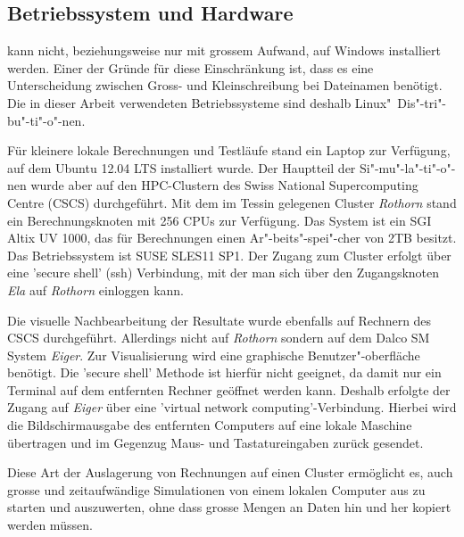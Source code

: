 \subsection{Betriebssystem und Hardware}
\label{Kapitel:Hardware}
\openfoam{} kann nicht, beziehungsweise nur mit grossem Aufwand, auf Windows installiert werden. Einer der Gründe für diese Einschränkung ist, dass es eine Unterscheidung zwischen Gross- und Kleinschreibung bei Dateinamen benötigt. Die in dieser Arbeit verwendeten Betriebssysteme sind deshalb Linux"~Dis"-tri"-bu"-ti"-o"-nen.

Für kleinere lokale Berechnungen und Testläufe stand ein Laptop zur Verfügung, auf dem Ubuntu 12.04 LTS installiert wurde.
Der Hauptteil der Si"-mu"-la"-ti"-o"-nen wurde aber auf den HPC-Clustern des Swiss National Supercomputing Centre (CSCS) durchgeführt.
Mit dem im Tessin gelegenen Cluster \emph{Rothorn} stand ein Berechnungsknoten mit 256 CPUs zur Verfügung. Das System ist ein SGI Altix UV 1000, das für Berechnungen einen Ar"-beits"-spei"-cher von 2TB besitzt.
Das Betriebssystem ist SUSE SLES11 SP1.
Der Zugang zum Cluster erfolgt über eine 'secure shell' (ssh) Verbindung, mit der man sich über den Zugangsknoten \emph{Ela} auf \emph{Rothorn} einloggen kann.

Die visuelle Nachbearbeitung der Resultate wurde ebenfalls auf Rech\-nern des CSCS durchgeführt. Allerdings nicht auf \emph{Rothorn} sondern auf dem \linebreak Dalco SM System \emph{Eiger}.
Zur Visualisierung wird eine graphische Benutzer"-oberfläche benötigt. Die 'secure shell' Methode ist hierfür nicht geeignet, da damit nur ein Terminal auf dem entfernten Rechner geöffnet werden kann. Deshalb erfolgte der Zugang auf \emph{Eiger} über eine 'virtual network computing'-Verbindung. Hierbei wird die Bildschirmausgabe des entfernten Computers auf eine lokale Maschine übertragen und im Gegenzug Maus- und Tastatureingaben zurück gesendet.

Diese Art der Auslagerung von Rechnungen auf einen Cluster ermöglicht es, auch grosse und zeitaufwändige Simulationen von einem lokalen Computer aus zu starten und auszuwerten, ohne dass grosse Mengen an Daten hin und her kopiert werden müssen.
